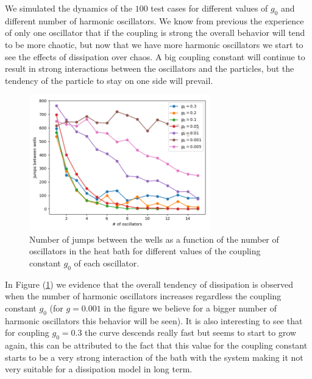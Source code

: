 We simulated the dynamics of the $100$ test cases for different values of $g_0$ and different number of harmonic oscillators. We know from previous the experience of only one oscillator that if the coupling is strong the overall behavior will tend to be more chaotic, but now that we have more harmonic oscillators we start to see the effects of dissipation over chaos. A big coupling constant will continue to result in strong interactions between the oscillators and the particles, but the tendency of the particle to stay on one side will prevail.

\begin{figure}[H]
\centering
\includegraphics[width=0.7\textwidth]{Figures/change_g_number.png}
\caption{Number of jumps between the wells as a function of the number of oscillators in the heat bath for different values of the coupling constant  $g_0$ of each oscillator.
}
\label{fig:changing_g}
\end{figure} 

In Figure (\ref{fig:changing_g}) we evidence that the overall tendency of dissipation is observed when the number of harmonic oscillators increases regardless the coupling constant $g_0$ (for $g=0.001$ in the figure we believe for a bigger number of harmonic oscillators this behavior will be seen). It is also interesting to see that for coupling $g_0=0.3$ the curve descends really fast but seems to start to grow again, this can be attributed to the fact that this value for the coupling constant starts to be a very strong interaction of the bath with the system making it not very suitable for a dissipation model in long term. 


